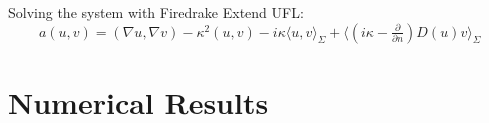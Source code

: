 \documentclass{beamer}
\begin{document}
\begin{frame}[fragile]{Solving the system with Firedrake}
    Extend UFL:
    \[
        a(u, v)
        = \left( \nabla u , \nabla v \right) - \kappa^2 \left( u , v \right)
        - i \kappa \langle u, v \rangle_{\Sigma}
        + \langle \left( i \kappa - \tfrac{\partial}{\partial n} \right) D(u)  v \rangle_\Sigma
    \]
\end{frame}

\section{Numerical Results}
\end{document}
